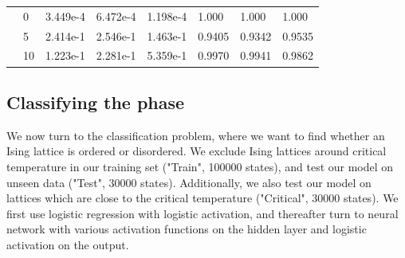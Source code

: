 \begin{table} [H]
\begin{tabularx}{\textwidth}{l|l|XXX|XXX}
		\parbox[t]{2mm}{}
		&0 & 3.449e-4 & 6.472e-4 & 1.198e-4 & 1.000 & 1.000 & 1.000\\
		&5 & 2.414e-1 & 2.546e-1 & 1.463e-1 & 0.9405 & 0.9342 & 0.9535\\
		&10 & 1.223e-1 & 2.281e-1 & 5.359e-1 & 0.9970 & 0.9941 & 0.9862\\ \hline\hline
	\end{tabularx}
\end{table}


\subsection{Classifying the phase}
We now turn to the classification problem, where we want to find whether an Ising lattice is ordered or disordered. We exclude Ising lattices around critical temperature in our training set ("Train", 100000 states), and test our model on unseen data ("Test", 30000 states). Additionally, we also test our model on lattices which are close to the critical temperature ("Critical", 30000 states).  We first use logistic regression with logistic activation, and thereafter turn to neural network with various activation functions on the hidden layer and logistic activation on the output. 

